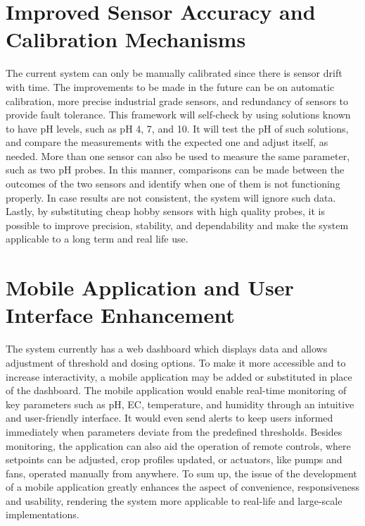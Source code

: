 \section{Improved Sensor Accuracy and Calibration Mechanisms}
The current system can only be manually calibrated since there is sensor drift with time. The improvements to be made in the future can be on automatic calibration, more precise industrial grade sensors, and redundancy of sensors to provide fault tolerance. This framework will self-check by using solutions known to have pH levels, such as pH 4, 7, and 10. It will test the pH of such solutions, and compare the measurements with the expected one and adjust itself, as needed. More than one sensor can also be used to measure the same parameter, such as two pH probes. In this manner, comparisons can be made between the outcomes of the two sensors and identify when one of them is not functioning properly. In case results are not consistent, the system will ignore such data. Lastly, by substituting cheap hobby sensors with high quality probes, it is possible to improve precision, stability, and dependability and make the system applicable to a long term and real life use.

\section{Mobile Application and User Interface Enhancement}
The system currently has a web dashboard which displays data and allows adjustment of threshold and dosing options. To make it more accessible and to increase interactivity, a mobile application may be added or substituted in place of the dashboard. The mobile application would enable real-time monitoring of key parameters such as pH, EC, temperature, and humidity through an intuitive and user-friendly interface. It would even send alerts to keep users informed immediately when parameters deviate from the predefined thresholds.  Besides monitoring, the application can also aid the operation of remote controls, where setpoints can be adjusted, crop profiles updated, or actuators, like pumps and fans, operated manually from anywhere. To sum up, the issue of the development of a mobile application greatly enhances the aspect of convenience, responsiveness and usability, rendering the system more applicable to real-life and large-scale implementations.

